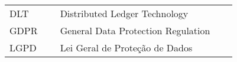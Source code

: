 

\begin{listaacron}

\begin{longtable}[l]{p{0.2\linewidth}p{0.7\linewidth}}
DLT & Distributed Ledger Technology\\
GDPR & General Data Protection Regulation\\
LGPD & Lei Geral de Proteção de Dados\\
\end{longtable}

\end{listaacron}

